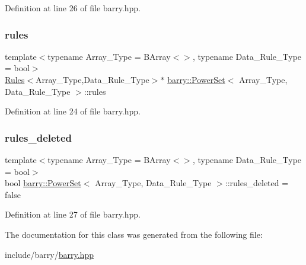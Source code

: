 Definition at line 26 of file barry.\+hpp.

\mbox{\label{classbarry_1_1_power_set_ae8eee09092e96fbefde320ba89fdcbfc}} 
\subsubsection{\texorpdfstring{rules}{rules}}
{\footnotesize\ttfamily template$<$typename Array\+\_\+\+Type  = B\+Array$<$$>$, typename Data\+\_\+\+Rule\+\_\+\+Type  = bool$>$ \\
\hyperlink{classbarry_1_1_rules}{Rules}$<$Array\+\_\+\+Type,Data\+\_\+\+Rule\+\_\+\+Type$>$$\ast$ \hyperlink{classbarry_1_1_power_set}{barry\+::\+Power\+Set}$<$ Array\+\_\+\+Type, Data\+\_\+\+Rule\+\_\+\+Type $>$\+::rules}



Definition at line 24 of file barry.\+hpp.

\mbox{\label{classbarry_1_1_power_set_aac868bcdb4a7f6c17d35aa29cf8e5028}} 
\subsubsection{\texorpdfstring{rules\+\_\+deleted}{rules\_deleted}}
{\footnotesize\ttfamily template$<$typename Array\+\_\+\+Type  = B\+Array$<$$>$, typename Data\+\_\+\+Rule\+\_\+\+Type  = bool$>$ \\
bool \hyperlink{classbarry_1_1_power_set}{barry\+::\+Power\+Set}$<$ Array\+\_\+\+Type, Data\+\_\+\+Rule\+\_\+\+Type $>$\+::rules\+\_\+deleted = false}



Definition at line 27 of file barry.\+hpp.



The documentation for this class was generated from the following file\+:\begin{DoxyCompactItemize}
\item 
include/barry/\hyperlink{barry_8hpp}{barry.\+hpp}\end{DoxyCompactItemize}
